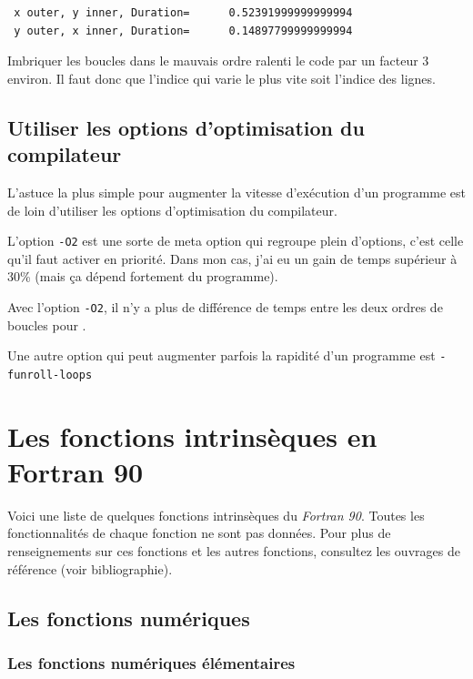 \documentclass[a4paper,twoside]{article}
\begin{document}
\begin{verbatim}
 x outer, y inner, Duration=      0.52391999999999994     
 y outer, x inner, Duration=      0.14897799999999994     
\end{verbatim}

Imbriquer les boucles dans le mauvais ordre ralenti le code par un facteur 3 environ. Il faut donc que l'indice qui varie le plus vite soit l'indice des lignes. 

\subsection{Utiliser les options d'optimisation du compilateur}
L'astuce la plus simple pour augmenter la vitesse d'exécution d'un programme est de loin d'utiliser les options d'optimisation du compilateur. 

L'option \texttt{-O2} est une sorte de meta option qui regroupe plein d'options, c'est celle qu'il faut activer en priorité. Dans mon cas, j'ai eu un gain de temps supérieur à 30\% (mais ça dépend fortement du programme).

\begin{remarque}
Avec l'option \texttt{-O2}, il n'y a plus de différence de temps entre les deux ordres de boucles pour .
\end{remarque}

Une autre option qui peut augmenter parfois la rapidité d'un programme est \texttt{-funroll-loops}

\section{Les fonctions intrinsèques en Fortran 90}
Voici une liste de quelques fonctions intrinsèques du \emph{Fortran 90}. 
Toutes les fonctionnalités de chaque fonction ne sont pas 
données. Pour plus de renseignements sur ces fonctions et les 
autres fonctions, consultez les ouvrages de référence (voir bibliographie).
 
\subsection{Les fonctions numériques}

\subsubsection{Les fonctions numériques élémentaires}
\end{document}
